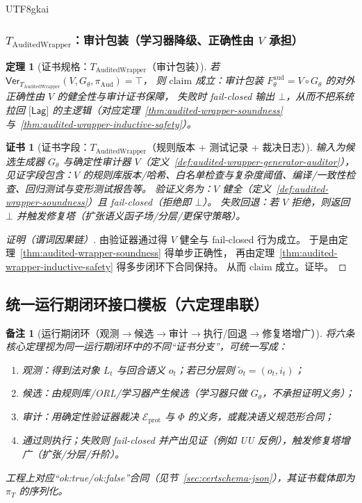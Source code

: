 \documentclass[12pt]{article}
\newtheorem{theorem}{定理}[section]
\newtheorem{remark}{备注}[section]
\newtheorem{Certificate}{证书}[section]
\begin{document}
\begin{CJK*}{UTF8}{gkai}
\subsubsection{$T_{\mathrm{AuditedWrapper}}$：审计包装（学习器降级、正确性由 $V$ 承担）}
\label{sec:certschema-t-audited}

\begin{theorem}[证书规格：$T_{\mathrm{AuditedWrapper}}$（审计包装）]
\label{thm:certspec-t-auditedwrapper}
若 $\mathsf{Ver}_{T_{\mathrm{AuditedWrapper}}}(V,G_\theta,\pi_{\mathrm{Aud}})=\top$，
则 $\mathrm{claim}$ 成立：审计包装 $F^{\mathrm{aud}}_\theta=V\circ G_\theta$ 的对外正确性由 $V$ 的健全性与审计证书保障，
失败时 fail-closed 输出 $\bot$，从而不把系统拉回 $\lbrack\mathsf{Lag}\rbrack$ 的主逻辑（对应定理~\ref{thm:audited-wrapper-soundness} 与~\ref{thm:audited-wrapper-inductive-safety}）。
\end{theorem}

\begin{Certificate}[证书字段：$T_{\mathrm{AuditedWrapper}}$（规则版本 + 测试记录 + 裁决日志）]
\label{cert:certspec-t-auditedwrapper}
输入为候选生成器 $G_\theta$ 与确定性审计器 $V$（定义~\ref{def:audited-wrapper-generator-auditor}），
见证字段包含：$V$ 的规则库版本/哈希、白名单检查与复杂度阈值、编译/一致性检查、回归测试与变形测试报告等。
验证义务为：$V$ 健全（定义~\ref{def:audited-wrapper-soundness}）且 fail-closed（拒绝即 $\bot$）。
失败回退：若 $V$ 拒绝，则返回 $\bot$ 并触发修复塔（扩张语义函子场/分层/更保守策略）。
\end{Certificate}

\begin{proof}[证明（谓词因果链）]
由验证器通过得 $V$ 健全与 fail-closed 行为成立。
于是由定理~\ref{thm:audited-wrapper-soundness} 得单步正确性，
再由定理~\ref{thm:audited-wrapper-inductive-safety} 得多步闭环下合同保持。
从而 $\mathrm{claim}$ 成立。证毕。
\end{proof}

\subsection{统一运行期闭环接口模板（六定理串联）}
\label{sec:certschema-runtime-loop}

\begin{remark}[运行期闭环（观测$\to$候选$\to$审计$\to$执行/回退$\to$修复塔增广）]
将六条核心定理视为同一运行期闭环中的不同“证书分支”，可统一写成：
\begin{enumerate}
  \item 观测：得到法对象 $L_t$ 与回合语义 $o_t$；若已分层则 $\tilde o_t=(o_t,i_t)$；
  \item 候选：由规则库/ORL/学习器产生候选（学习器只做 $G_\theta$，不承担证明义务）；
  \item 审计：用确定性验证器裁决 $\mathcal{E}_{\mathrm{prot}}$ 与 $\Phi$ 的义务，或裁决语义规范形合同；
  \item 通过则执行；失败则 fail-closed 并产出见证（例如 UU 反例），触发修复塔增广（扩张/分层/升阶）。
\end{enumerate}
工程上对应“ok:true/ok:false”合同（见节~\ref{sec:certschema-json}），其证书载体即为 $\pi_T$ 的序列化。
\end{remark}


\end{CJK*}
\end{document}
